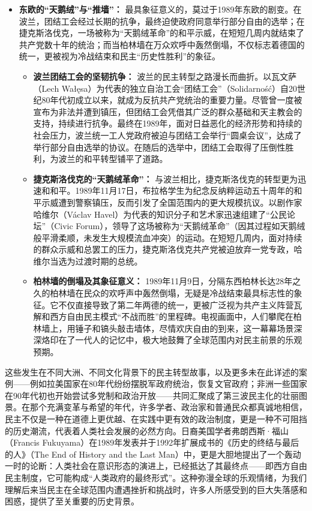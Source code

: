 \documentclass[UTF8, 10pt]{ctexbook}
\begin{document}
\begin{itemize}
\begin{itemize}
    \end{itemize}
    \item \textbf{东欧的“天鹅绒”与“推墙”：} 最具象征意义的，莫过于1989年东欧的剧变。在波兰，团结工会经过长期的抗争，最终迫使政府同意举行部分自由的选举；在捷克斯洛伐克，一场被称为“天鹅绒革命”的和平示威，在短短几周内就结束了共产党数十年的统治；而当柏林墙在万众欢呼中轰然倒塌，不仅标志着德国的统一，更被视为冷战结束和民主“历史性胜利”的象征。
    \begin{itemize}
        \item \textbf{波兰团结工会的坚韧抗争：} 波兰的民主转型之路漫长而曲折。以瓦文萨（Lech Wałęsa）为代表的独立自治工会“团结工会”（Solidarność）自20世纪80年代初成立以来，就成为反抗共产党统治的重要力量。尽管曾一度被宣布为非法并遭到镇压，但团结工会凭借其广泛的群众基础和天主教会的支持，持续进行抗争。最终在1989年，面对日益恶化的经济形势和持续的社会压力，波兰统一工人党政府被迫与团结工会举行“圆桌会议”，达成了举行部分自由选举的协议。在随后的选举中，团结工会取得了压倒性胜利，为波兰的和平转型铺平了道路。
        \item \textbf{捷克斯洛伐克的“天鹅绒革命”：} 与波兰相比，捷克斯洛伐克的转型更为迅速和和平。1989年11月17日，布拉格学生为纪念反纳粹运动五十周年的和平示威遭到警察镇压，反而引发了全国范围内的更大规模抗议。以剧作家哈维尔（Václav Havel）为代表的知识分子和艺术家迅速组建了“公民论坛”（Civic Forum），领导了这场被称为“天鹅绒革命”（因其过程如天鹅绒般平滑柔顺，未发生大规模流血冲突）的运动。在短短几周内，面对持续的群众示威和总罢工的压力，捷克斯洛伐克共产党被迫放弃一党专政，哈维尔当选为过渡时期的总统。
        \item \textbf{柏林墙的倒塌及其象征意义：} 1989年11月9日，分隔东西柏林长达28年之久的柏林墙在民众的欢呼声中轰然倒塌，无疑是冷战结束最具标志性的象征。它不仅直接导致了第二年两德的统一，更被广泛视为共产主义阵营瓦解和西方自由民主模式“不战而胜”的里程碑。电视画面中，人们攀爬在柏林墙上，用锤子和镐头敲击墙体，尽情欢庆自由的到来，这一幕幕场景深深烙印在了一代人的记忆中，极大地鼓舞了全球范围内对民主前景的乐观预期。
    \end{itemize}
\end{itemize}

这些发生在不同大洲、不同文化背景下的民主转型故事，以及更多未在此详述的案例——例如拉美国家在80年代纷纷摆脱军政府统治，恢复文官政府；非洲一些国家在90年代初也开始尝试多党制和政治开放——共同汇聚成了第三波民主化的壮丽图景。在那个充满变革与希望的年代，许多学者、政治家和普通民众都真诚地相信，民主不仅是一种在道德上更优越、在实践中更有效的政治制度，更是一种不可阻挡的历史潮流，代表着人类社会发展的必然方向。日裔美国学者弗朗西斯·福山（Francis Fukuyama）在1989年发表并于1992年扩展成书的《历史的终结与最后的人》（The End of History and the Last Man）中，更是大胆地提出了一个轰动一时的论断：人类社会在意识形态的演进上，已经抵达了其最终点——即西方自由民主制度，它可能构成“人类政府的最终形式”。这种弥漫全球的乐观情绪，为我们理解后来当民主在全球范围内遭遇挫折和挑战时，许多人所感受到的巨大失落感和困惑，提供了至关重要的历史背景。
\end{document}
